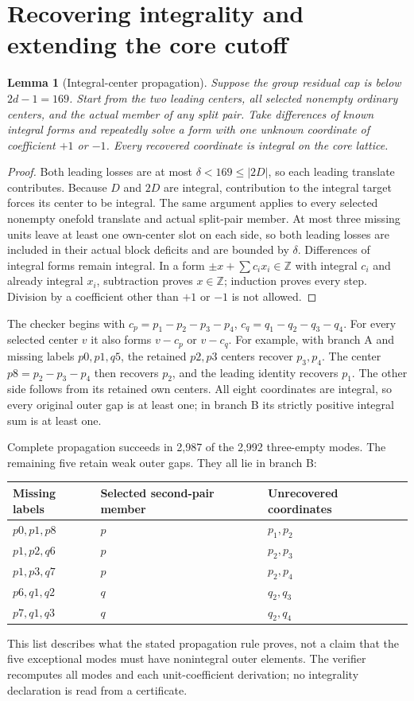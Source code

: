 \documentclass[11pt,a4paper]{article}
\newcommand{\Z}{\mathbb Z}
\newtheorem{lemma}[theorem]{Lemma}
\begin{document}
\section{Recovering integrality and extending the core cutoff}
\begin{lemma}[Integral-center propagation]\label{integrality}
Suppose the group residual cap is below $2d-1=169$.
Start from the two leading centers, all selected nonempty ordinary
centers, and the actual member of any split pair. Take differences of
known integral forms and repeatedly solve a form with one unknown
coordinate of coefficient $+1$ or $-1$. Every recovered coordinate is
integral on the core lattice.
\end{lemma}
\begin{proof}
Both leading losses are at most $\delta<169\le|2D|$, so each leading
translate contributes. Because $D$ and $2D$ are integral, contribution
to the integral target forces its center to be integral. The same argument
applies to every selected nonempty onefold translate and actual split-pair
member. At most three missing units leave at least one own-center slot
on each side, so both leading losses are included in their actual block
deficits and are bounded by $\delta$.
Differences of integral forms remain integral. In a form
$\pm x+\sum c_i x_i\in\Z$ with integral $c_i$ and already integral
$x_i$, subtraction proves $x\in\Z$; induction proves every step.
Division by a coefficient other than $+1$ or $-1$ is not allowed.
\end{proof}
The checker begins with
$c_p=p_1-p_2-p_3-p_4$, $c_q=q_1-q_2-q_3-q_4$.
For every selected center $v$ it also forms $v-c_p$ or $v-c_q$.
For example, with branch A and missing labels $p0,p1,q5$, the retained
$p2,p3$ centers recover $p_3,p_4$. The center
$p8=p_2-p_3-p_4$ then recovers $p_2$, and the leading identity recovers
$p_1$. The other side follows from its retained own centers.
All eight coordinates are integral, so every original outer gap is at
least one; in branch B its strictly positive integral sum is at least one.

Complete propagation succeeds in 2,987 of the 2,992 three-empty modes.
The remaining five retain weak outer gaps. They all lie in branch B:
\begin{center}\small
\begin{tabular}{lll}\toprule
Missing labels&Selected second-pair member&Unrecovered coordinates\\\midrule
$p0,p1,p8$&$p$&$p_1,p_2$\\
$p1,p2,q6$&$p$&$p_2,p_3$\\
$p1,p3,q7$&$p$&$p_2,p_4$\\
$p6,q1,q2$&$q$&$q_2,q_3$\\
$p7,q1,q3$&$q$&$q_2,q_4$\\\bottomrule
\end{tabular}
\end{center}
This list describes what the stated propagation rule proves, not a claim
that the five exceptional modes must have nonintegral outer elements.
The verifier recomputes all modes and each unit-coefficient derivation;
no integrality declaration is read from a certificate.
\end{document}
